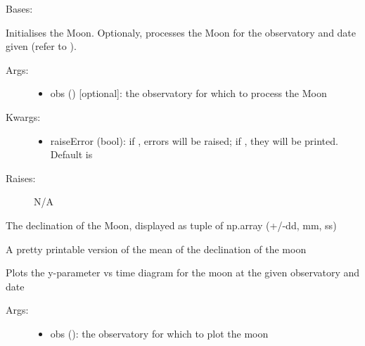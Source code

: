 \documentclass[letterpaper,10pt,english]{sphinxmanual}
\begin{document}
\begin{fulllineitems}
\label{astroobs:astroobs.Moon.Moon}
Bases: 

Initialises the Moon. Optionaly, processes the Moon for the observatory and date given (refer to ).
\begin{description}
\item[{Args:}] \leavevmode\begin{itemize}
\item {} 
obs () {[}optional{]}: the observatory for which to process the Moon

\end{itemize}

\item[{Kwargs:}] \leavevmode\begin{itemize}
\item {} 
raiseError (bool): if , errors will be raised; if , they will be printed. Default is 

\end{itemize}

\item[{Raises:}] \leavevmode
N/A

\end{description}

\begin{fulllineitems}
\label{astroobs:astroobs.Moon.Moon.dec}
The declination of the Moon, displayed as tuple of np.array (+/-dd, mm, ss)

\end{fulllineitems}


\begin{fulllineitems}
\label{astroobs:astroobs.Moon.Moon.decStr}
A pretty printable version of the mean of the declination of the moon

\end{fulllineitems}


\begin{fulllineitems}
\label{astroobs:astroobs.Moon.Moon.plot}
Plots the y-parameter vs time diagram for the moon at the given observatory and date
\begin{description}
\item[{Args:}] \leavevmode\begin{itemize}
\item {} 
obs (): the observatory for which to plot the moon


\end{itemize}
\end{description}
\end{fulllineitems}
\end{fulllineitems}
\end{document}
